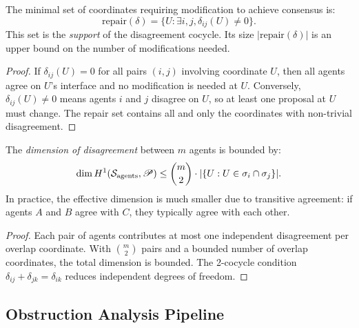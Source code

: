\documentclass[11pt]{article}
\newcommand{\ProposalSheaf}{\mathscr{P}}
\newcommand{\AgentSite}{\mathcal{S}_{\mathrm{agents}}}
\begin{document}
\begin{theorem}\label{thm:disagree-local}
The minimal set of coordinates requiring modification to achieve
consensus is:
\[
  \mathrm{repair}(\delta) = \{U : \exists i,j, \delta_{ij}(U) \neq 0\}.
\]
This set is the \emph{support} of the disagreement cocycle.  Its size
$|\mathrm{repair}(\delta)|$ is an upper bound on the number of
modifications needed.
\end{theorem}

\begin{proof}
If $\delta_{ij}(U) = 0$ for all pairs $(i,j)$ involving coordinate $U$,
then all agents agree on $U$'s interface and no modification is needed
at $U$.  Conversely, $\delta_{ij}(U) \neq 0$ means agents $i$ and $j$
disagree on $U$, so at least one proposal at $U$ must change.  The
repair set contains all and only the coordinates with non-trivial
disagreement.
\end{proof}

\begin{proposition}\label{prop:disagree-dim}
The \emph{dimension of disagreement} between $m$ agents is bounded by:
\[
  \dim \Hcoh{1}(\AgentSite, \ProposalSheaf) \leq
  \binom{m}{2} \cdot |\{U : U \in \sigma_i \cap \sigma_j\}|.
\]
In practice, the effective dimension is much smaller due to transitive
agreement: if agents $A$ and $B$ agree with $C$, they typically agree
with each other.
\end{proposition}

\begin{proof}
Each pair of agents contributes at most one independent disagreement
per overlap coordinate.  With $\binom{m}{2}$ pairs and a bounded
number of overlap coordinates, the total dimension is bounded.  The
2-cocycle condition $\delta_{ij} + \delta_{jk} = \delta_{ik}$ reduces
independent degrees of freedom.
\end{proof}

\subsection{Obstruction Analysis Pipeline}\label{subsec:obstruction-pipeline}
\end{document}
